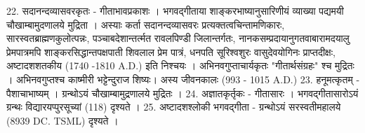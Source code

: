 22. सदानन्दव्यासवरकृतः - गीताभावप्रकाशः । 
भगवद्गीताया शाङ्करभाष्यानुसारिणीयं व्याख्या पद्यमयी चौखाम्बामुदणालये मुद्रिता । अस्याः कर्ता सदानन्दव्यासवरः प्रत्यक्तत्वचिन्तामणिकारः, सारस्वतब्राह्मणकुलोत्पन्नः, पञ्चाबदेशान्तर्त्मत रावलपिण्डी जिलान्तर्गतः, नानकसम्प्रदायानुगतवाबारामदयालु प्रेमपात्रमपि शाङ्करसिद्धान्तपक्षपाती शिवलाल प्रेम पात्रं, धनपति सूरिश्वशुरः वासुदेवयोगिनः प्राप्तदीक्षः, अष्टादशशतकीय (1740 -1810 A.D.) इति निश्चयः । अभिनवगुप्ताचार्यकृतः "गीतार्थसंग्रहः" श्च मुद्रितः । अभिनवगुप्तश्च काष्मीरी भट्टेन्दुराज शिष्यः। अस्य जीवनकालः (993 - 1015 A.D.)
23. हनूमत्कृतम् - पैशाचाभाष्यम् । ग्रन्थोऽयं चौखाम्बामुद्रणालये मुद्रितः । 
24. अज्ञातकृर्तृकः - गीतासारः । भगवद्गीतासारोऽयं ग्रन्थः विद्यारयप्पुरसूच्यां (118) दृश्यते । 
25. अष्टादशश्लोकी भगवद्गीता - ग्रन्थोऽयं सरस्वतीमहालये (8939 DC. TSML) दृश्यते । 


